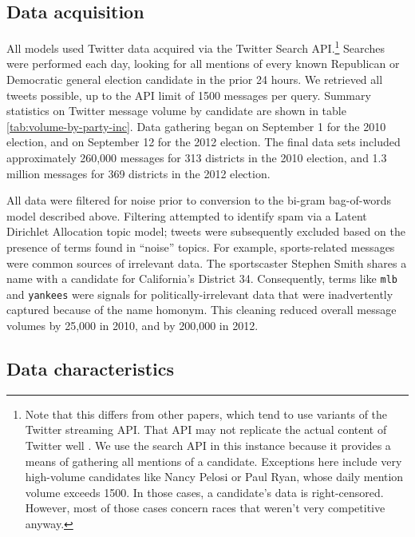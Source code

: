 \documentclass{sig-alternate-2013}
\begin{document}
\subsection{Data acquisition}
\label{sec:data-acquisition}

All models used Twitter data acquired via the Twitter Search
API.\footnote{Note that this differs from other papers, which tend to
  use variants of the Twitter streaming API. That API may not
  replicate the actual content of Twitter well
  \cite{morstatter2013sample}. We use the search API in
  this instance because it provides a means of gathering all mentions
  of a candidate. Exceptions here include very
  high-volume candidates like Nancy Pelosi or
  Paul Ryan, whose daily mention volume exceeds 1500. In those cases, a candidate's data is
  right-censored. However, most of those cases concern races that
  weren't very competitive anyway.} Searches were performed each day,
looking for all mentions of every
known Republican or Democratic general election candidate in the prior
24 hours. We retrieved all tweets possible, up to the API limit of 1500 messages per query. Summary
statistics on Twitter message volume by candidate are shown in table
\ref{tab:volume-by-party-inc}. Data gathering began
on September 1 for the 2010 election, and on September 12 for the 2012
election. The final data sets included approximately 260,000 messages for
313 districts in the 2010 election, and 1.3 million messages for 369
districts in the 2012 election.

All data were filtered for noise prior to conversion to the bi-gram
bag-of-words model described above. Filtering attempted to identify
spam via a Latent Dirichlet Allocation topic model; tweets were
subsequently excluded based on the presence of terms found in
``noise'' topics. For example, sports-related messages were common
sources of irrelevant data. The sportscaster Stephen Smith shares a
name with a candidate for California's District 34. Consequently,
terms like \texttt{mlb} and \texttt{yankees} were signals for
politically-irrelevant data that were inadvertently captured because
of the name homonym. This cleaning reduced overall message volumes by
25,000 in 2010, and by 200,000 in 2012.


\subsection{Data characteristics}
\label{sec:data-characteristics}
\end{document}
